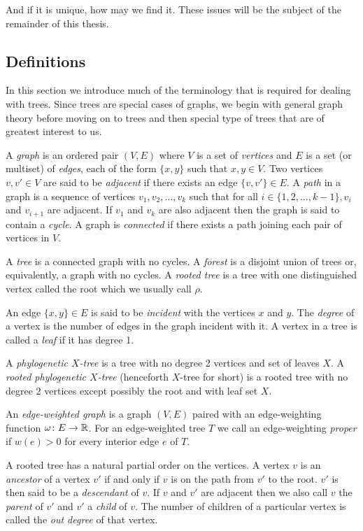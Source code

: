 And if it is
unique, how may we find it.  These issues will be the subject of the remainder
of this thesis.

\subsection{Definitions}
\label{sec:definitions}

In this section we introduce much of the terminology that is required for
dealing with trees.  Since trees are special cases of graphs, we begin with
general graph theory before moving on to trees and then special type of trees
that are of greatest interest to us.

A \textit{graph} is an ordered pair $(V,E)$ where $V$ is a set of
\textit{vertices} and $E$ is a set (or multiset) of \textit{edges}, each of
the form $\{x,y\}$ such that $x,y \in V$.  Two vertices $v,v' \in V$ are said
to be \textit{adjacent} if there exists an edge $\{v,v'\} \in E$.  A
\textit{path} in a graph is a sequence of vertices $v_1,v_2,\dotsc,v_k$ such
that for all $i \in \{1,2,\dotsc,k-1\}, v_i$ and $v_{i+1}$ are adjacent.  If
$v_1$ and $v_k$ are also adjacent then the graph is said to contain a
\textit{cycle}.  A graph is \textit{connected} if there exists a path joining
each pair of vertices in $V$.

A \textit{tree} is a connected graph with no cycles.  A \textit{forest} is a
disjoint union of trees or, equivalently, a graph with no cycles.  A
\textit{rooted tree} is a tree with one distinguished vertex called the root
which we usually call $\rho$.

An edge $\{x,y\} \in E$ is said to be \textit{incident} with the vertices $x$
and $y$.  The \textit{degree} of a vertex is the number of edges in the graph
incident with it.  A vertex in a tree is called a \textit{leaf} if it has
degree 1.

A \textit{phylogenetic $X$-tree} is a tree with no degree 2 vertices and set
of leaves $X$.  A \textit{rooted phylogenetic $X$-tree} (henceforth $X$-tree
for short) is a rooted tree with no degree 2 vertices except possibly the root
and with leaf set $X$.

An \textit{edge-weighted graph} is a graph $(V,E)$ paired with an
edge-weighting function $\omega \colon E \to {\mathbb R}$.  For an edge-weighted tree
$T$ we call an edge-weighting \textit{proper} if $w(e) > 0$ for every interior
edge $e$ of $T$.

A rooted tree has a natural partial order on the vertices.  A vertex $v$ is an
\textit{ancestor} of a vertex $v'$ if and only if $v$ is on the path from $v'$
to the root.  $v'$ is then said to be a \textit{descendant} of $v$.  If $v$
and $v'$ are adjacent then we also call $v$ the \textit{parent} of $v'$ and
$v'$ a \textit{child} of $v$.  The number of children of a particular vertex
is called the \textit{out degree} of that vertex.

